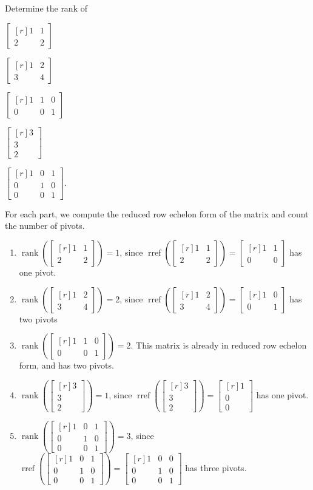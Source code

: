 \documentclass{problemset}
\DeclareMathOperator{\Rref}{rref}
\DeclareMathOperator{\Rank}{rank}
\newcommand{\rref}{\Rref}
\newcommand{\mat}[1]{\begin{bmatrix*}[r]#1\end{bmatrix*}}
\begin{document}
	\begin{parts}
		\item Determine the rank of
		\begin{enumerate*}
			\item $\mat{1&1\\2&2}$
			\item $\mat{1&2\\3&4}$
			\item $\mat{1&1&0\\0&0&1}$
			\item $\mat{3\\3\\2}$
			\item $\mat{1&0&1\\0&1&0\\0&0&1}$.
		\end{enumerate*}
		\begin{solution}
			For each part, we compute the reduced row echelon form of the matrix
			and count the number of pivots.
			\begin{enumerate}
				\item $\Rank\left(\mat{1&1\\2&2}\right)=1$, since
					$\rref\left(\mat{1&1\\2&2}\right)=\mat{1&1\\0&0}$ has one pivot.
				\item $\Rank\left(\mat{1&2\\3&4}\right)=2$, since
					$\rref\left(\mat{1&2\\3&4}\right)=\mat{1&0\\0&1}$ has two pivots
				\item $\Rank\left(\mat{1&1&0\\0&0&1}\right)=2$.
					This matrix is already in reduced row echelon form, and has two pivots.
				\item $\Rank\left(\mat{3\\3\\2}\right)=1$, since
					$\rref\left(\mat{3\\3\\2}\right)=\mat{1\\0\\0}$ has one pivot.
				\item $\Rank\left(\mat{1&0&1\\0&1&0\\0&0&1}\right)=3$, since
					$\rref\left(\mat{1&0&1\\0&1&0\\0&0&1}\right)=\mat{1&0&0\\0&1&0\\0&0&1}$
					has three pivots.
			\end{enumerate}
		\end{solution}
	\end{parts}
\end{document}
